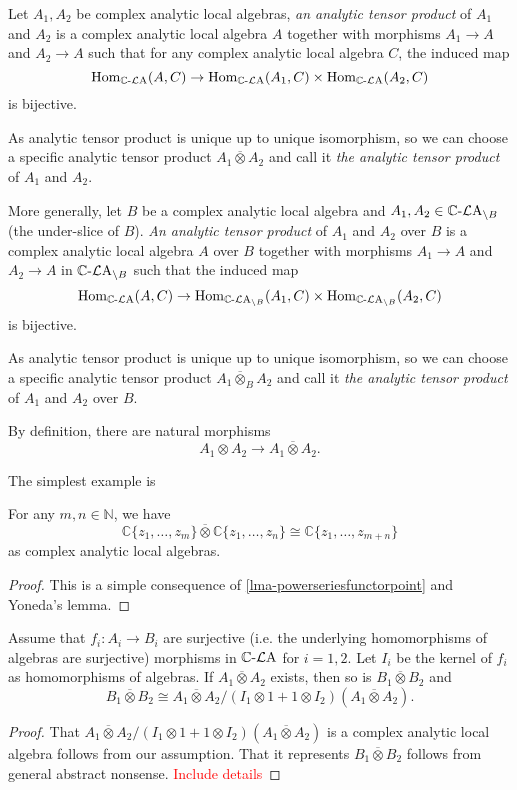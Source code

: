\begin{definition}\label{def-analytictensor}
    Let $A_1,A_2$ be complex analytic local algebras, \emph{an analytic tensor product} of $A_1$ and $A_2$ is a complex analytic local algebra $A$ together with morphisms $A_1\rightarrow A$ and $A_2\rightarrow A$ such that for any complex analytic local algebra $C$, the induced map
    \[
      \operatorname{Hom}_{\mathbb{C}\text{-}\mathcal{L}\mathrm{A}}(A,C)\rightarrow  \operatorname{Hom}_{\mathbb{C}\text{-}\mathcal{L}\mathrm{A}}(A_1,C)\times  \operatorname{Hom}_{\mathbb{C}\text{-}\mathcal{L}\mathrm{A}}(A_2,C)
    \]
    is bijective.

    As analytic tensor product is unique up to unique isomorphism, so we can choose a specific analytic tensor product $A_1\overline{\otimes} A_2$ and call it \emph{the analytic tensor product} of $A_1$ and $A_2$.

    More generally, let $B$ be a complex analytic local algebra and $A_1,A_2\in \mathbb{C}\text{-}\mathcal{L}\mathrm{A}_{\backslash B}$ (the under-slice of $B$).
    \emph{An analytic tensor product} of $A_1$ and $A_2$ over $B$ is a complex analytic local algebra $A$ over $B$ together with morphisms $A_1\rightarrow A$ and $A_2\rightarrow A$ in $\mathbb{C}\text{-}\mathcal{L}\mathrm{A}_{\backslash B}$ such that the induced map
    \[
      \operatorname{Hom}_{\mathbb{C}\text{-}\mathcal{L}\mathrm{A}}(A,C)\rightarrow  \operatorname{Hom}_{\mathbb{C}\text{-}\mathcal{L}\mathrm{A}_{\backslash B}}(A_1,C)\times \operatorname{Hom}_{\mathbb{C}\text{-}\mathcal{L}\mathrm{A}_{\backslash B}}(A_2,C)
    \]
    is bijective.
    
    As analytic tensor product is unique up to unique isomorphism, so we can choose a specific analytic tensor product $A_1\overline{\otimes}_B A_2$ and call it \emph{the analytic tensor product} of $A_1$ and $A_2$ over $B$.
\end{definition}
By definition, there are natural morphisms 
\[
    A_1\otimes A_2\rightarrow A_1\overline{\otimes} A_2.
\]

The simplest example is 
\begin{lemma}\label{lma-Cmexistencetensor}
    For any $m,n\in \mathbb{N}$, we have
    \[
        \mathbb{C}\{ z_1,\ldots,z_m \}\overline{\otimes} \mathbb{C}\{ z_1,\ldots,z_n \}\cong  \mathbb{C}\{ z_1,\ldots,z_{m+n} \}
    \]
    as complex analytic local algebras.
\end{lemma}
\begin{proof}
    This is a simple consequence of \cref{lma-powerseriesfunctorpoint} and Yoneda's lemma.    
\end{proof}

\begin{lemma}\label{lma-quotientimplyexistencetensor}
    Assume that $f_i:A_i\rightarrow B_i$ are  surjective (i.e. the underlying homomorphisms of algebras are surjective) morphisms in $\mathbb{C}\text{-}\mathcal{L}\mathrm{A}$ for $i=1,2$. Let $I_i$ be the kernel of $f_i$ as homomorphisms of algebras.
    If $A_1\overline{\otimes} A_2$ exists, then so is $B_1 \overline{\otimes} B_2$ and
    \[
        B_1 \overline{\otimes} B_2\cong A_1\overline{\otimes} A_2/ (I_1\otimes 1+1\otimes I_2)(A_1\overline{\otimes} A_2).
    \]
\end{lemma}
\begin{proof}
    That $A_1\overline{\otimes} A_2/ (I_1\otimes 1+1\otimes I_2)(A_1\overline{\otimes} A_2)$ is a complex analytic local algebra follows from our assumption. That it represents  $B_1 \overline{\otimes} B_2$ follows from general abstract nonsense. \textcolor{red}{Include details}
\end{proof}

